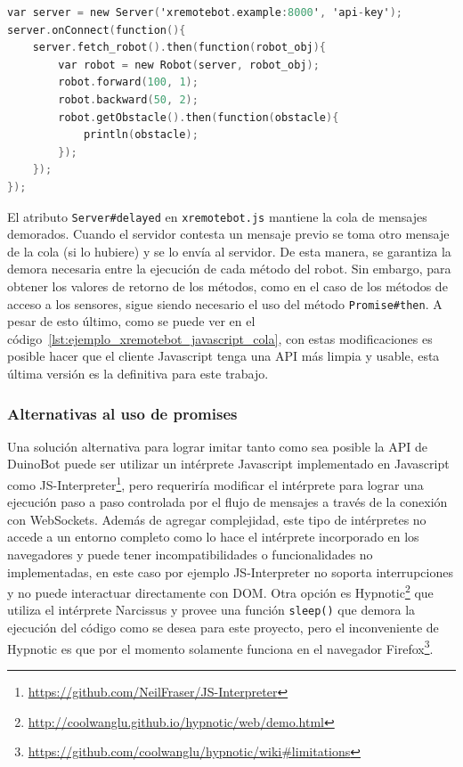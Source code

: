 \begin{lstlisting}[language=C,
caption={Ejemplo de XRemoteBot en Javascript con empleo de una cola para
serializar mensajes},
label=lst:ejemplo_xremotebot_javascript_cola]
var server = new Server('xremotebot.example:8000', 'api-key');
server.onConnect(function(){
    server.fetch_robot().then(function(robot_obj){
        var robot = new Robot(server, robot_obj);
        robot.forward(100, 1);
        robot.backward(50, 2);
        robot.getObstacle().then(function(obstacle){
            println(obstacle);
        });
    });
});
\end{lstlisting}

El atributo \texttt{Server\#delayed} en \texttt{xremotebot.js} mantiene la cola
de mensajes demorados.
Cuando el servidor contesta un mensaje previo se toma otro mensaje
de la cola (si lo hubiere) y se lo envía al servidor. De esta manera,
se garantiza la demora necesaria entre la ejecución de cada método
del robot. Sin embargo, para obtener los valores de retorno de los métodos,
como en el caso de los métodos de acceso a los sensores, sigue siendo
necesario el uso del método \texttt{Promise\#then}. A pesar de esto último,
como se puede ver en el código~\ref{lst:ejemplo_xremotebot_javascript_cola},
con estas modificaciones es posible hacer que el cliente Javascript
tenga una API más limpia y usable, esta última versión es la definitiva
para este trabajo.

\subsubsection{Alternativas al uso de promises}

Una solución alternativa para lograr imitar tanto como sea posible la
API de DuinoBot puede ser utilizar un intérprete Javascript implementado en
Javascript como
JS-Interpreter\footnote{\url{https://github.com/NeilFraser/JS-Interpreter}},
pero requeriría modificar el intérprete para lograr una ejecución paso a paso
controlada por el flujo de mensajes a través de la conexión con WebSockets.
Además de agregar complejidad, este tipo de intérpretes no accede a un entorno
completo como lo hace el intérprete incorporado en los navegadores y puede
tener incompatibilidades o funcionalidades no implementadas, en este caso
por ejemplo JS-Interpreter no soporta interrupciones y no puede interactuar
directamente con DOM. Otra opción es
Hypnotic\footnote{\url{http://coolwanglu.github.io/hypnotic/web/demo.html}}
que utiliza el intérprete Narcissus y provee una función \texttt{sleep()} que
demora la ejecución del código como se desea para este proyecto, pero el
inconveniente de Hypnotic es que por el momento solamente funciona en el
navegador
Firefox\footnote{\url{https://github.com/coolwanglu/hypnotic/wiki\#limitations}}.


